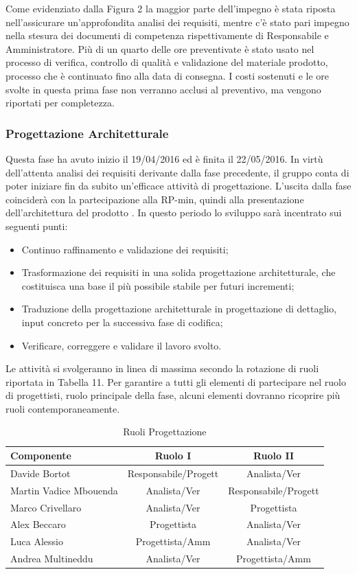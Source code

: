 \documentclass[a4paper,11pt]{article}
\begin{document}
		Come evidenziato dalla Figura 2 la maggior parte dell'impegno è stata riposta nell'assicurare un'approfondita analisi dei requisiti, mentre c'è stato pari impegno nella stesura dei documenti di competenza rispettivamente di Responsabile e Amministratore. Più di un quarto delle ore preventivate è stato usato nel processo di verifica, controllo di qualità e validazione del materiale prodotto, processo che è continuato fino alla data di consegna. I costi sostenuti e le ore svolte in questa prima fase non verranno acclusi al preventivo, ma vengono riportati per completezza.
		\pagebreak
		\subsubsection{Progettazione Architetturale}
		Questa fase ha avuto inizio il 19/04/2016 ed è finita il 22/05/2016. In virtù dell'attenta analisi dei requisiti derivante dalla fase precedente, il gruppo conta di poter iniziare fin da subito un'efficace attività di progettazione. L'uscita dalla fase coinciderà con la partecipazione alla RP-min, quindi alla presentazione dell'architettura del prodotto . In questo periodo lo sviluppo sarà incentrato sui seguenti punti:
		\begin{itemize}
		\item Continuo raffinamento e validazione dei requisiti;
		\item Trasformazione dei requisiti in una solida progettazione architetturale, che costituisca una base il più possibile stabile per futuri incrementi;
		\item Traduzione della progettazione architetturale in progettazione di dettaglio, input concreto per la successiva fase di codifica;
		\item Verificare, correggere e validare il lavoro svolto.
		\end{itemize}
		Le attività si svolgeranno in linea di massima secondo la rotazione di ruoli riportata in Tabella 11. Per garantire a tutti gli elementi di partecipare nel ruolo di progettisti, ruolo principale della fase, alcuni elementi dovranno ricoprire più ruoli contemporaneamente.
		\begin{table}[h!]			
		\begin{center}
			\begin{tabular}{l c c}
			\textbf{Componente} & \textbf{Ruolo I} & \textbf{Ruolo II} \\
			\midrule
			Davide Bortot & Responsabile/Progett & Analista/Ver\\
			Martin Vadice Mbouenda & Analista/Ver & Responsabile/Progett\\
			Marco Crivellaro & Analista/Ver & Progettista\\
			Alex Beccaro & Progettista & Analista/Ver\\
			Luca Alessio & Progettista/Amm & Analista/Ver\\
			Andrea Multineddu & Analista/Ver & Progettista/Amm\\
			\midrule
			\end{tabular}
		\end{center}
		\caption{Ruoli Progettazione}
		\end{table}
		\pagebreak
		
\end{document}
